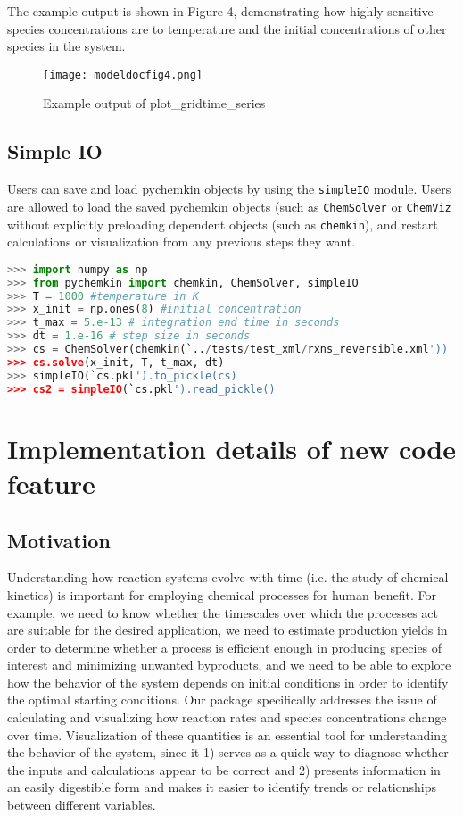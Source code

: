 \documentclass[12pt]{article}
\begin{document}
The example output is shown in Figure 4, demonstrating how highly sensitive species concentrations are to temperature and the initial concentrations of other species in the system. 

\begin{figure}[h!]
  \caption{Example output of plot\_gridtime\_series}
  \centering
  \texttt{[image: modeldocfig4.png]}
\end{figure} 

\subsection{Simple IO}
Users can save and load pychemkin objects by using the \texttt{simpleIO} module. Users are allowed to load the saved pychemkin objects (such as \texttt{ChemSolver} or \texttt{ChemViz} without explicitly preloading dependent objects (such as \texttt{chemkin}), and restart calculations or visualization from any previous steps they want.

\begin{lstlisting}[language = Python, basicstyle = \ttfamily,columns = fullflexible, showstringspaces = False]
>>> import numpy as np
>>> from pychemkin import chemkin, ChemSolver, simpleIO
>>> T = 1000 #temperature in K
>>> x_init = np.ones(8) #initial concentration
>>> t_max = 5.e-13 # integration end time in seconds
>>> dt = 1.e-16 # step size in seconds
>>> cs = ChemSolver(chemkin(`../tests/test_xml/rxns_reversible.xml'))
>>> cs.solve(x_init, T, t_max, dt)
>>> simpleIO(`cs.pkl').to_pickle(cs)
>>> cs2 = simpleIO(`cs.pkl').read_pickle()
\end{lstlisting}

\section{Implementation details of new code feature}
\subsection{Motivation}
Understanding how reaction systems evolve with time (i.e. the study of chemical kinetics) is important for employing chemical processes for human benefit. For example, we need to know whether the timescales over which the processes act are suitable for the desired application, we need to estimate production yields in order to determine whether a process is efficient enough in producing species of interest and minimizing unwanted byproducts, and we need to be able to explore how the behavior of the system depends on initial conditions in order to identify the optimal starting conditions. Our package specifically addresses the issue of calculating and visualizing how reaction rates and species concentrations change over time. Visualization of these quantities is an essential tool for understanding the behavior of the system, since it 1) serves as a quick way to diagnose whether the inputs and calculations appear to be correct and 2) presents information in an easily digestible form and makes it easier to identify trends or relationships between different variables. 
\end{document}
